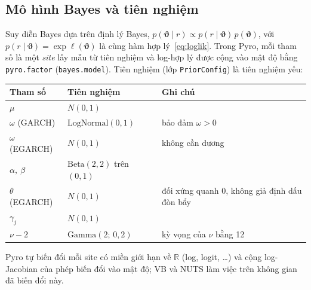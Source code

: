 \documentclass[11pt,a4paper]{article}
\renewcommand{\_}{\gachduoi\allowbreak}
\newcommand{\tep}[1]{\texttt{#1}}
\newcommand{\ham}[1]{\texttt{#1}}
\newcommand{\R}{\mathbb{R}}
\newcommand{\btheta}{\boldsymbol\vartheta}
\begin{document}
\subsection{Mô hình Bayes và tiên nghiệm}
Suy diễn Bayes dựa trên định lý Bayes, $p(\btheta\mid r)\propto p(r\mid\btheta)\,p(\btheta)$, với $p(r\mid\btheta)=\exp\ell(\btheta)$ là cùng hàm hợp lý~\eqref{eq:loglik}. Trong Pyro, mỗi tham số là một \emph{site} lấy mẫu từ tiên nghiệm và log-hợp lý được cộng vào mật độ bằng \ham{pyro.factor} (\ham{bayes.model}). Tiên nghiệm (lớp \tep{PriorConfig}) là tiên nghiệm yếu:
\begin{center}\small
\begin{tabular}{@{}lll@{}}
\toprule
\textbf{Tham số} & \textbf{Tiên nghiệm} & \textbf{Ghi chú} \\
\midrule
$\mu$ & $N(0,1)$ & \\
$\omega$ (GARCH) & $\mathrm{LogNormal}(0,1)$ & bảo đảm $\omega>0$ \\
$\omega$ (EGARCH) & $N(0,1)$ & không cần dương \\
$\alpha,\ \beta$ & $\mathrm{Beta}(2,2)$ trên $(0,1)$ & \\
$\theta$ (EGARCH) & $N(0,1)$ & đối xứng quanh 0, không giả định dấu đòn bẩy \\
$\gamma_j$ & $N(0,1)$ & \\
$\nu-2$ & $\mathrm{Gamma}(2;\,0{,}2)$ & kỳ vọng của $\nu$ bằng 12 \\
\bottomrule
\end{tabular}
\end{center}
Pyro tự biến đổi mỗi site có miền giới hạn về $\R$ (log, logit, \dots) và cộng log-Jacobian của phép biến đổi vào mật độ; VB và NUTS làm việc trên không gian đã biến đổi này.
\end{document}
